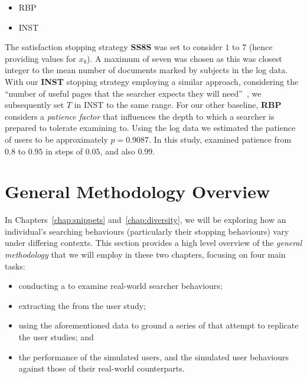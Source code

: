\begin{itemize}
    \item[\blueboxbold{SS12}] RBP
\end{itemize}

\begin{itemize}
    \item[\blueboxbold{SS13}] INST
\end{itemize}

The satisfaction stopping strategy \textbf{SS8S} was set to consider $1$ to $7$ (hence providing values for $x_8$). A maximum of seven was chosen as this was closest integer to the mean number of documents marked by subjects in the log data. With our \textbf{INST} stopping strategy employing a similar approach, considering the ``number of useful pages that the searcher expects they will need''~\cite{moffat2015inst}, we subsequently set $T$ in INST to the same range. For our other baseline, \textbf{RBP} considers a \emph{patience factor} that influences the depth to which a searcher is prepared to tolerate examining to. Using the log data we estimated the patience of users to be approximately $p=0.9087$. In this study, examined patience from $0.8$ to $0.95$ in steps of $0.05$, and also $0.99$.

\section{General Methodology Overview}\label{sec:csm:methodology}
In Chapters~\ref{chap:snippets} and~\ref{chap:diversity}, we will be exploring how an individual's searching behaviours (particularly their stopping behaviours) vary under differing contexts. This section provides a high level overview of the \emph{general methodology} that we will employ in these two chapters, focusing on four main tasks:

\begin{itemize}
    \item{conducting a  to examine real-world searcher behaviours;}
    \item{extracting the  from the user study;}
    \item{using the aforementioned data to ground a series of  that attempt to replicate the user studies; and}
    \item{ the performance of the simulated users, and  the simulated user behaviours against those of their real-world counterparts.}
\end{itemize}

